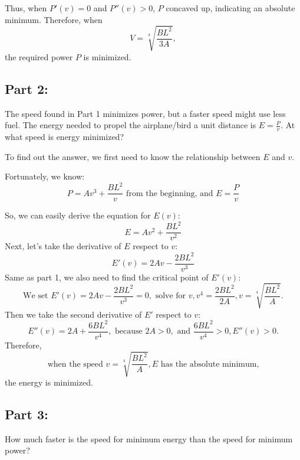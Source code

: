 \documentclass{article}
\begin{document}
Thus, when \( P'(v) = 0 \) and \( P''(v) > 0 \), \( P \) concaved up, indicating an absolute minimum. Therefore, when
\[
V = \sqrt[4]{\frac{BL^2}{3A}},
\]
the required power \( P \) is minimized.

\subsection*{Part 2:}
The speed found in Part 1 minimizes power, but a faster speed might use less fuel. The energy needed to propel the airplane/bird a unit distance is \( E = \frac{P}{v} \). At what speed is energy minimized?

To find out the answer, we first need to know the relationship between \( E \) and \( v \). 

Fortunately, we know:
\[
P = Av^3 + \frac{BL^2}{v} \text{ from the beginning, and }
E = \frac{P}{v}
\]

So, we can easily derive the equation for \( E(v) \):
\[
E = Av^2 + \frac{BL^2}{v^2}
\]
Next, let's take the derivative of \(E\) respect to \(v\):
\[
E'(v) = 2Av-\frac{2BL^2}{v^3}
\]
Same as part 1, we also need to find the critical point of \(E'(v)\):
\[\text{We set } E'(v) = 2Av-\frac{2BL^2}{v^3} = 0,\text{ solve for }v, v^4=\frac{2BL^2}{2A}, v = \sqrt[4]{\frac{BL^2}{A}}\text{.}\]
Then we take the second derivative of \(E'\) respect to \(v\):
\[E''(v) = 2A + \frac{6BL^2}{v^4},
\text{ because } 2A > 0, \text{ and } \frac{6BL^2}{v^4} > 0, E''(v) > 0.\]
Therefore,
 \[\text{when the speed }v = \sqrt[4]{\frac{BL^2}{A}}, E\text{ has the absolute minimum,}\]
  the energy is minimized.

\subsection*{Part 3:}
How much faster is the speed for minimum energy than the speed for minimum power?
\end{document}
